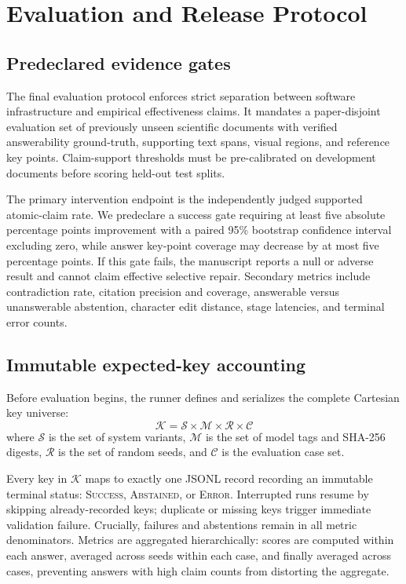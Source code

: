 \section{Evaluation and Release Protocol}
\subsection{Predeclared evidence gates}
The final evaluation protocol enforces strict separation between software infrastructure and empirical effectiveness claims. It mandates a paper-disjoint evaluation set of previously unseen scientific documents with verified answerability ground-truth, supporting text spans, visual regions, and reference key points. Claim-support thresholds must be pre-calibrated on development documents before scoring held-out test splits.

The primary intervention endpoint is the independently judged supported atomic-claim rate. We predeclare a success gate requiring at least five absolute percentage points improvement with a paired 95\% bootstrap confidence interval excluding zero, while answer key-point coverage may decrease by at most five percentage points. If this gate fails, the manuscript reports a null or adverse result and cannot claim effective selective repair. Secondary metrics include contradiction rate, citation precision and coverage, answerable versus unanswerable abstention, character edit distance, stage latencies, and terminal error counts.

\subsection{Immutable expected-key accounting}
Before evaluation begins, the runner defines and serializes the complete Cartesian key universe:
\begin{equation}
\mathcal{K} = \mathcal{S} \times \mathcal{M} \times \mathcal{R} \times \mathcal{C}
\end{equation}
where $\mathcal{S}$ is the set of system variants, $\mathcal{M}$ is the set of model tags and SHA-256 digests, $\mathcal{R}$ is the set of random seeds, and $\mathcal{C}$ is the evaluation case set.

Every key in $\mathcal{K}$ maps to exactly one JSONL record recording an immutable terminal status: \textsc{Success}, \textsc{Abstained}, or \textsc{Error}. Interrupted runs resume by skipping already-recorded keys; duplicate or missing keys trigger immediate validation failure. Crucially, failures and abstentions remain in all metric denominators. Metrics are aggregated hierarchically: scores are computed within each answer, averaged across seeds within each case, and finally averaged across cases, preventing answers with high claim counts from distorting the aggregate.


